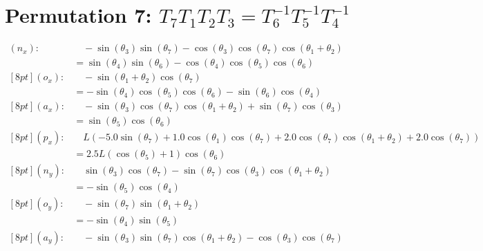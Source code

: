 \documentclass[12pt, a4paper]{article}
\begin{document}
\section{Permutation 7: $T_{7}T_{1}T_{2}T_{3} = T_{6}^{-1}T_{5}^{-1}T_{4}^{-1}$}
\allowdisplaybreaks
\begin{align}
(n_{x}): & \quad - \sin{\left(\theta_{3} \right)} \sin{\left(\theta_{7} \right)} - \cos{\left(\theta_{3} \right)} \cos{\left(\theta_{7} \right)} \cos{\left(\theta_{1} + \theta_{2} \right)} \\ 
&= \sin{\left(\theta_{4} \right)} \sin{\left(\theta_{6} \right)} - \cos{\left(\theta_{4} \right)} \cos{\left(\theta_{5} \right)} \cos{\left(\theta_{6} \right)} \\ [8pt] 
(o_{x}): & \quad - \sin{\left(\theta_{1} + \theta_{2} \right)} \cos{\left(\theta_{7} \right)} \\ 
&= - \sin{\left(\theta_{4} \right)} \cos{\left(\theta_{5} \right)} \cos{\left(\theta_{6} \right)} - \sin{\left(\theta_{6} \right)} \cos{\left(\theta_{4} \right)} \\ [8pt] 
(a_{x}): & \quad - \sin{\left(\theta_{3} \right)} \cos{\left(\theta_{7} \right)} \cos{\left(\theta_{1} + \theta_{2} \right)} + \sin{\left(\theta_{7} \right)} \cos{\left(\theta_{3} \right)} \\ 
&= \sin{\left(\theta_{5} \right)} \cos{\left(\theta_{6} \right)} \\ [8pt] 
(p_{x}): & \quad L \left(- 5.0 \sin{\left(\theta_{7} \right)} + 1.0 \cos{\left(\theta_{1} \right)} \cos{\left(\theta_{7} \right)} + 2.0 \cos{\left(\theta_{7} \right)} \cos{\left(\theta_{1} + \theta_{2} \right)} + 2.0 \cos{\left(\theta_{7} \right)}\right) \\ 
&= 2.5 L \left(\cos{\left(\theta_{5} \right)} + 1\right) \cos{\left(\theta_{6} \right)} \\ [8pt] 
(n_{y}): & \quad \sin{\left(\theta_{3} \right)} \cos{\left(\theta_{7} \right)} - \sin{\left(\theta_{7} \right)} \cos{\left(\theta_{3} \right)} \cos{\left(\theta_{1} + \theta_{2} \right)} \\ 
&= - \sin{\left(\theta_{5} \right)} \cos{\left(\theta_{4} \right)} \\ [8pt] 
(o_{y}): & \quad - \sin{\left(\theta_{7} \right)} \sin{\left(\theta_{1} + \theta_{2} \right)} \\ 
&= - \sin{\left(\theta_{4} \right)} \sin{\left(\theta_{5} \right)} \\ [8pt] 
(a_{y}): & \quad - \sin{\left(\theta_{3} \right)} \sin{\left(\theta_{7} \right)} \cos{\left(\theta_{1} + \theta_{2} \right)} - \cos{\left(\theta_{3} \right)} \cos{\left(\theta_{7} \right)} \\ 

\end{align}
\end{document}

